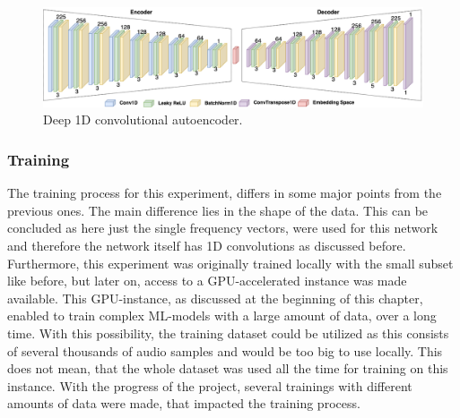  \begin{figure}[htb!]
	\caption{Deep 1D convolutional autoencoder.}
	\label{fig:cae_1D}
	\centering
	\includegraphics[width=\textwidth]{images/experiments/autoencoder_deep_1D.png}
\end{figure}


\subsubsection{Training}
The training process for this experiment, differs in some major points from the previous ones. The main difference lies in the shape of the data. This can be concluded as here just the single frequency vectors, were used for this network and therefore the network itself has 1D convolutions as discussed before. Furthermore, this experiment was originally trained locally with the small subset like before, but later on, access to a GPU-accelerated instance was made available. This GPU-instance, as discussed at the beginning of this chapter, enabled to train complex ML-models with a large amount of data, over a long time. With this possibility, the training dataset could be utilized as this consists of several thousands of audio samples and would be too big to use locally. This does not mean, that the whole dataset was used all the time for training on this instance. With the progress of the project, several trainings with different amounts of data were made, that impacted the training process.



